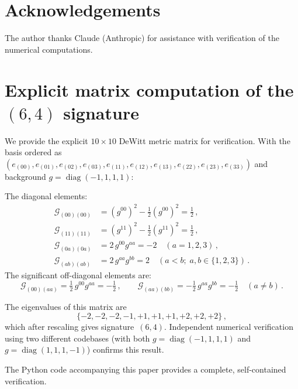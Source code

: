 \documentclass[12pt,a4paper]{article}
\theoremstyle{definition}
\newcommand{\diag}{\operatorname{diag}}
\begin{document}

\section*{Acknowledgements}

The author thanks Claude (Anthropic) for assistance with verification of the numerical computations.






\appendix

\section{Explicit matrix computation of the \texorpdfstring{$(6,4)$}{(6,4)} signature}
\label{app:matrix}

We provide the explicit $10 \times 10$ DeWitt metric matrix for verification.
With the basis ordered as $(e_{(00)}, e_{(01)}, e_{(02)}, e_{(03)}, e_{(11)}, e_{(12)}, e_{(13)}, e_{(22)}, e_{(23)}, e_{(33)})$ and background $g = \diag(-1,1,1,1)$:

The diagonal elements:
\begin{align}
\mathcal{G}_{(00)(00)} &= (g^{00})^2 - \tfrac{1}{2}(g^{00})^2 = \tfrac{1}{2}\,,\\
\mathcal{G}_{(11)(11)} &= (g^{11})^2 - \tfrac{1}{2}(g^{11})^2 = \tfrac{1}{2}\,,\\
\mathcal{G}_{(0a)(0a)} &= 2\, g^{00}g^{aa} = -2 \quad (a = 1,2,3)\,,\\
\mathcal{G}_{(ab)(ab)} &= 2\, g^{aa}g^{bb} = 2 \quad (a < b; \; a,b \in \{1,2,3\})\,.
\end{align}
The significant off-diagonal elements are:
\begin{equation}
\mathcal{G}_{(00)(aa)} = \tfrac{1}{2}\, g^{00}g^{aa} = -\tfrac{1}{2}\,, \qquad
\mathcal{G}_{(aa)(bb)} = -\tfrac{1}{2}\, g^{aa}g^{bb} = -\tfrac{1}{2} \quad (a \ne b)\,.
\end{equation}

The eigenvalues of this matrix are
\[
\{-2, -2, -2, -1, +1, +1, +1, +2, +2, +2\}\,,
\]
which after rescaling gives signature~$(6,4)$.
Independent numerical verification using two different codebases (with both $g = \diag(-1,1,1,1)$ and $g = \diag(1,1,1,-1)$) confirms this result.

The Python code accompanying this paper provides a complete, self-contained verification.
\end{document}
